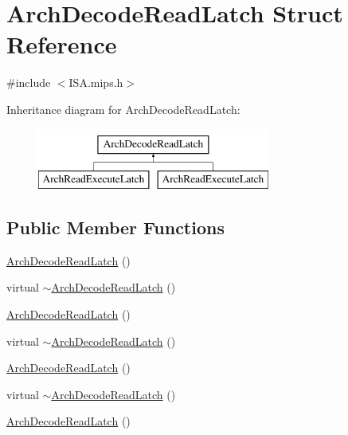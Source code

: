 \hypertarget{struct_arch_decode_read_latch}{\section{Arch\+Decode\+Read\+Latch Struct Reference}
\label{struct_arch_decode_read_latch}
}


{\ttfamily \#include $<$I\+S\+A.\+mips.\+h$>$}

Inheritance diagram for Arch\+Decode\+Read\+Latch\+:\begin{figure}[H]
\begin{center}
\leavevmode
\includegraphics[height=2.000000cm]{struct_arch_decode_read_latch}
\end{center}
\end{figure}
\subsection*{Public Member Functions}
\begin{DoxyCompactItemize}
\item 
\hyperlink{struct_arch_decode_read_latch_ab5079dc332c4dc9ae70784fd6163aba4}{Arch\+Decode\+Read\+Latch} ()
\item 
virtual \hyperlink{struct_arch_decode_read_latch_a2b4f3af28cd2639610c1673f7ebb6d42}{$\sim$\+Arch\+Decode\+Read\+Latch} ()
\item 
\hyperlink{struct_arch_decode_read_latch_ab5079dc332c4dc9ae70784fd6163aba4}{Arch\+Decode\+Read\+Latch} ()
\item 
virtual \hyperlink{struct_arch_decode_read_latch_a2b4f3af28cd2639610c1673f7ebb6d42}{$\sim$\+Arch\+Decode\+Read\+Latch} ()
\item 
\hyperlink{struct_arch_decode_read_latch_ab5079dc332c4dc9ae70784fd6163aba4}{Arch\+Decode\+Read\+Latch} ()
\item 
virtual \hyperlink{struct_arch_decode_read_latch_a2b4f3af28cd2639610c1673f7ebb6d42}{$\sim$\+Arch\+Decode\+Read\+Latch} ()
\item 
\hyperlink{struct_arch_decode_read_latch_ab5079dc332c4dc9ae70784fd6163aba4}{Arch\+Decode\+Read\+Latch} ()
\end{DoxyCompactItemize}
